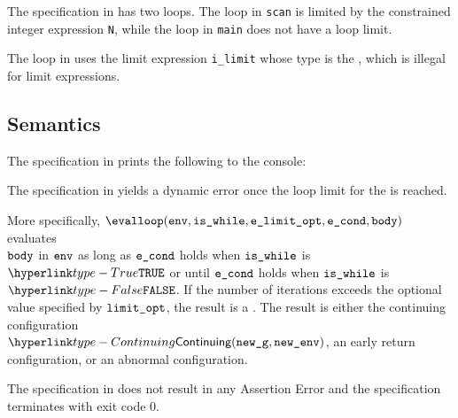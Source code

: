 


The specification in  has two loops.
The loop in \verb|scan| is limited by the constrained integer
expression \verb|N|, while the loop in \verb|main| does not
have a loop limit.

The loop in  uses
the limit expression \verb|i_limit| whose type is the
\unconstrainedintegertypeterm, which is illegal for
limit expressions.



\subsection{Semantics}
The specification in  prints the
following to the console:

The specification in  yields a dynamic
error once the loop limit for the \whilestatementterm{} is reached.




More specifically, $\evalloop(\env, \iswhile, \velimitopt, \econd, \vbody)$
evaluates\\ $\texttt{body}$ in $\texttt{env}$ as long as $\texttt{e\_cond}$ holds when $\texttt{is\_while}$ is $\True$
or until $\texttt{e\_cond}$ holds when $\texttt{is\_while}$ is $\False$.
If the number of iterations exceeds the optional value specified by $\texttt{limit\_opt}$,
the result is a \dynamicerrorterm{}.
The result is either the continuing configuration \\ $\Continuing(\newg,\newenv)$,
an early return configuration, or an abnormal configuration.

The specification in  does not result in any Assertion Error
and the specification terminates with exit code $0$.

